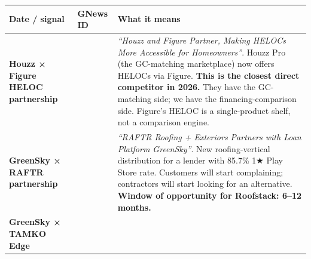\documentclass[
  10pt,
]{article}
\let\origtexttt\texttt
\renewcommand{\texttt}[1]{\origtexttt{\seqsplit{#1}}}
\begin{document}
\begin{longtable}[]{@{}lll@{}}
\toprule
\begin{minipage}[b]{0.30\columnwidth}\raggedright
Date / signal\strut
\end{minipage} & \begin{minipage}[b]{0.30\columnwidth}\raggedright
GNews ID\strut
\end{minipage} & \begin{minipage}[b]{0.30\columnwidth}\raggedright
What it means\strut
\end{minipage}\tabularnewline
\midrule
\endhead
\begin{minipage}[t]{0.30\columnwidth}\raggedright
\textbf{Houzz × Figure HELOC partnership}\strut
\end{minipage} & \begin{minipage}[t]{0.30\columnwidth}\raggedright
\texttt{gnews\_9df5a02b}\strut
\end{minipage} & \begin{minipage}[t]{0.30\columnwidth}\raggedright
\emph{``Houzz and Figure Partner, Making HELOCs More Accessible for Homeowners''}. Houzz Pro (the
GC-matching marketplace) now offers HELOCs via Figure. \textbf{This is the closest direct competitor
in 2026.} They have the GC-matching side; we have the financing-comparison side. Figure's HELOC is a
single-product shelf, not a comparison engine.\strut
\end{minipage}\tabularnewline
\begin{minipage}[t]{0.30\columnwidth}\raggedright
\textbf{GreenSky × RAFTR partnership}\strut
\end{minipage} & \begin{minipage}[t]{0.30\columnwidth}\raggedright
\texttt{gnews\_25987bf1}\strut
\end{minipage} & \begin{minipage}[t]{0.30\columnwidth}\raggedright
\emph{``RAFTR Roofing + Exteriors Partners with Loan Platform GreenSky''}. New roofing-vertical
distribution for a lender with 85.7\% 1★ Play Store rate. Customers will start complaining;
contractors will start looking for an alternative. \textbf{Window of opportunity for Roofstack:
6--12 months.}\strut
\end{minipage}\tabularnewline
\begin{minipage}[t]{0.30\columnwidth}\raggedright
\textbf{GreenSky × TAMKO Edge}\strut
\end{minipage} & \begin{minipage}[t]{0.30\columnwidth}\raggedright

\end{minipage}
\end{longtable}
\end{document}
